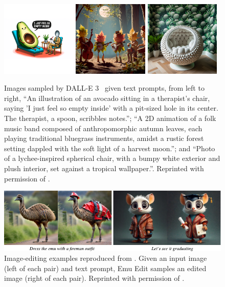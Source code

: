 \begin{figure}[t]
    \centering
    \includegraphics[width=0.32\textwidth]{figs/thesis/dalle3/1.png}
    \hfill
    \includegraphics[width=0.32\textwidth]{figs/thesis/dalle3/2.png}
    \hfill
    \includegraphics[width=0.32\textwidth]{figs/thesis/dalle3/4.png}
    \caption{Images sampled by DALL-E 3~\citep{betker2023improving} given text prompts, from left to right, ``An illustration of an avocado sitting in a therapist's chair, saying 'I just feel so empty inside' with a pit-sized hole in its center. The therapist, a spoon, scribbles notes.''; ``A 2D animation of a folk music band composed of anthropomorphic autumn leaves, each playing traditional bluegrass instruments, amidst a rustic forest setting dappled with the soft light of a harvest moon.''; and ``Photo of a lychee-inspired spherical chair, with a bumpy white exterior and plush interior, set against a tropical wallpaper.''. Reprinted with permission of \citeauthor{betker2023improving}.}
    \label{fig:dalle-3-samples}
    \centering
    \includegraphics{figs/thesis/emu_edit_examples.pdf}
    \caption{Image-editing examples reproduced from \citet{sheynin2023emu}. Given an input image (left of each pair) and text prompt, Emu Edit samples an edited image (right of each pair). Reprinted with permission of \citeauthor{sheynin2023emu}.}
    \label{fig:emu-edit-samples}
\end{figure}

